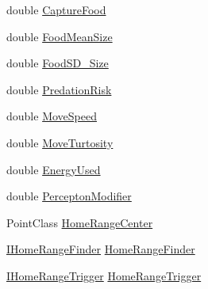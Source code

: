 \begin{DoxyCompactItemize}
\item 
double \hyperlink{class_p_a_z___dispersal_1_1_animal_a045feeb73b308e3f069047054541f172}{Capture\-Food}
\item 
double \hyperlink{class_p_a_z___dispersal_1_1_animal_a0f6c51e1b35349ce54af5dbab96d5ee1}{Food\-Mean\-Size}
\item 
double \hyperlink{class_p_a_z___dispersal_1_1_animal_a8ba27380534690ce514c124868974773}{Food\-S\-D\-\_\-\-Size}
\item 
double \hyperlink{class_p_a_z___dispersal_1_1_animal_ae8a45a1b5f8eb626687229a451344e1e}{Predation\-Risk}
\item 
double \hyperlink{class_p_a_z___dispersal_1_1_animal_a488f95919d2be77bc7d9ace60b910074}{Move\-Speed}
\item 
double \hyperlink{class_p_a_z___dispersal_1_1_animal_a5fa4bba2b4b86d25238efcbb2173df22}{Move\-Turtosity}
\item 
double \hyperlink{class_p_a_z___dispersal_1_1_animal_a748babf634db70b0b81b2ddfc9fc8d07}{Energy\-Used}
\item 
double \hyperlink{class_p_a_z___dispersal_1_1_animal_a584fd1ec29a4a1f4c7877932fce0a8f1}{Percepton\-Modifier}
\item 
Point\-Class \hyperlink{class_p_a_z___dispersal_1_1_animal_a87ae2528a7ab8720a8b36a14f34f8e39}{Home\-Range\-Center}
\item 
\hyperlink{interface_p_a_z___dispersal_1_1_i_home_range_finder}{I\-Home\-Range\-Finder} \hyperlink{class_p_a_z___dispersal_1_1_animal_af549289a84e74f4c4235ab2da6c217ae}{Home\-Range\-Finder}
\item 
\hyperlink{interface_p_a_z___dispersal_1_1_i_home_range_trigger}{I\-Home\-Range\-Trigger} \hyperlink{class_p_a_z___dispersal_1_1_animal_a5b249a386894fdbc269bf80e6cd0ff0c}{Home\-Range\-Trigger}

\end{DoxyCompactItemize}

